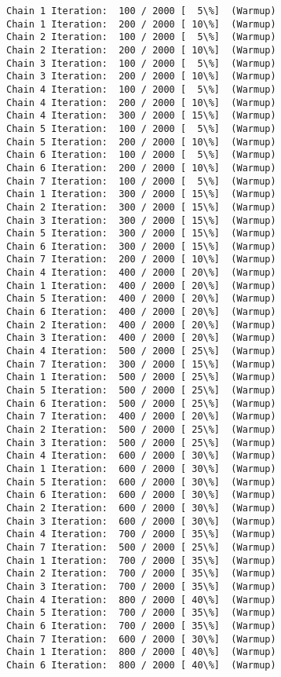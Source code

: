 \documentclass[11pt]{article}
\begin{document}
    \begin{Verbatim}[commandchars=\\\{\}]
Chain 1 Iteration:  100 / 2000 [  5\%]  (Warmup)
Chain 1 Iteration:  200 / 2000 [ 10\%]  (Warmup)
Chain 2 Iteration:  100 / 2000 [  5\%]  (Warmup)
Chain 2 Iteration:  200 / 2000 [ 10\%]  (Warmup)
Chain 3 Iteration:  100 / 2000 [  5\%]  (Warmup)
Chain 3 Iteration:  200 / 2000 [ 10\%]  (Warmup)
Chain 4 Iteration:  100 / 2000 [  5\%]  (Warmup)
Chain 4 Iteration:  200 / 2000 [ 10\%]  (Warmup)
Chain 4 Iteration:  300 / 2000 [ 15\%]  (Warmup)
Chain 5 Iteration:  100 / 2000 [  5\%]  (Warmup)
Chain 5 Iteration:  200 / 2000 [ 10\%]  (Warmup)
Chain 6 Iteration:  100 / 2000 [  5\%]  (Warmup)
Chain 6 Iteration:  200 / 2000 [ 10\%]  (Warmup)
Chain 7 Iteration:  100 / 2000 [  5\%]  (Warmup)
Chain 1 Iteration:  300 / 2000 [ 15\%]  (Warmup)
Chain 2 Iteration:  300 / 2000 [ 15\%]  (Warmup)
Chain 3 Iteration:  300 / 2000 [ 15\%]  (Warmup)
Chain 5 Iteration:  300 / 2000 [ 15\%]  (Warmup)
Chain 6 Iteration:  300 / 2000 [ 15\%]  (Warmup)
Chain 7 Iteration:  200 / 2000 [ 10\%]  (Warmup)
Chain 4 Iteration:  400 / 2000 [ 20\%]  (Warmup)
Chain 1 Iteration:  400 / 2000 [ 20\%]  (Warmup)
Chain 5 Iteration:  400 / 2000 [ 20\%]  (Warmup)
Chain 6 Iteration:  400 / 2000 [ 20\%]  (Warmup)
Chain 2 Iteration:  400 / 2000 [ 20\%]  (Warmup)
Chain 3 Iteration:  400 / 2000 [ 20\%]  (Warmup)
Chain 4 Iteration:  500 / 2000 [ 25\%]  (Warmup)
Chain 7 Iteration:  300 / 2000 [ 15\%]  (Warmup)
Chain 1 Iteration:  500 / 2000 [ 25\%]  (Warmup)
Chain 5 Iteration:  500 / 2000 [ 25\%]  (Warmup)
Chain 6 Iteration:  500 / 2000 [ 25\%]  (Warmup)
Chain 7 Iteration:  400 / 2000 [ 20\%]  (Warmup)
Chain 2 Iteration:  500 / 2000 [ 25\%]  (Warmup)
Chain 3 Iteration:  500 / 2000 [ 25\%]  (Warmup)
Chain 4 Iteration:  600 / 2000 [ 30\%]  (Warmup)
Chain 1 Iteration:  600 / 2000 [ 30\%]  (Warmup)
Chain 5 Iteration:  600 / 2000 [ 30\%]  (Warmup)
Chain 6 Iteration:  600 / 2000 [ 30\%]  (Warmup)
Chain 2 Iteration:  600 / 2000 [ 30\%]  (Warmup)
Chain 3 Iteration:  600 / 2000 [ 30\%]  (Warmup)
Chain 4 Iteration:  700 / 2000 [ 35\%]  (Warmup)
Chain 7 Iteration:  500 / 2000 [ 25\%]  (Warmup)
Chain 1 Iteration:  700 / 2000 [ 35\%]  (Warmup)
Chain 2 Iteration:  700 / 2000 [ 35\%]  (Warmup)
Chain 3 Iteration:  700 / 2000 [ 35\%]  (Warmup)
Chain 4 Iteration:  800 / 2000 [ 40\%]  (Warmup)
Chain 5 Iteration:  700 / 2000 [ 35\%]  (Warmup)
Chain 6 Iteration:  700 / 2000 [ 35\%]  (Warmup)
Chain 7 Iteration:  600 / 2000 [ 30\%]  (Warmup)
Chain 1 Iteration:  800 / 2000 [ 40\%]  (Warmup)
Chain 6 Iteration:  800 / 2000 [ 40\%]  (Warmup)

\end{Verbatim}
\end{document}
